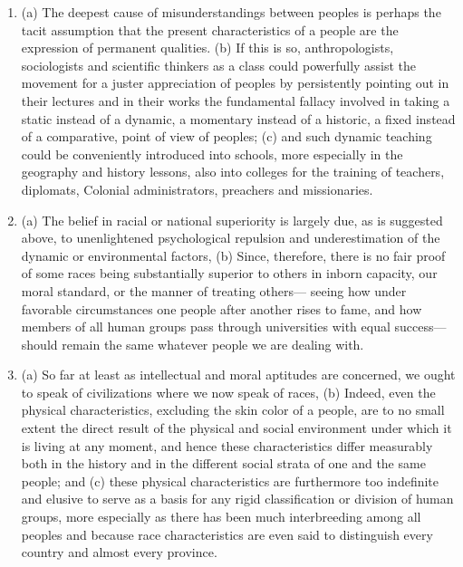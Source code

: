 \documentclass[letterpaper,10pt,english]{jupyterBook}
\begin{document}
\begin{enumerate}
\item {} 
\sphinxAtStartPar
(a) The deepest cause of misunderstandings between peoples is perhaps the tacit assumption that the present characteristics of a people are the expression of permanent qualities. (b) If this is so, anthropologists, sociologists and scientific thinkers as a class could powerfully assist the movement for a juster appreciation of peoples by persistently pointing out in their lectures and in their works the fundamental fallacy involved in taking a static instead of a dynamic, a momentary instead of a historic, a fixed instead of a comparative, point of view of peoples; (c) and such dynamic teaching could be conveniently introduced into schools, more especially in the geography and history lessons, also into colleges for the training of teachers, diplomats, Colonial administrators, preachers and missionaries.

\item {} 
\sphinxAtStartPar
(a) The belief in racial or national superiority is largely due, as is suggested above, to unenlightened psychological repulsion and underestimation of the dynamic or environmental factors, (b) Since, therefore, there is no fair proof of some races being substantially superior to others in inborn capacity, our moral standard, or the manner of treating others— seeing how under favorable circumstances one people after another rises to fame, and how members of all human groups pass through universities with equal success— should remain the same whatever people we are dealing with.

\item {} 
\sphinxAtStartPar
(a) So far at least as intellectual and moral aptitudes are concerned, we ought to speak of civilizations where we now speak of races, (b) Indeed, even the physical characteristics, excluding the skin color of a people, are to no small extent the direct result of the physical and social environment under which it is living at any moment, and hence these characteristics differ measurably both in the history and in the different social strata of one and the same people; and (c) these physical characteristics are furthermore too indefinite and elusive to serve as a basis for any rigid classification or division of human groups, more especially as there has been much interbreeding among all peoples and because race characteris­tics are even said to distinguish every country and almost every province.


\end{enumerate}
\end{document}
